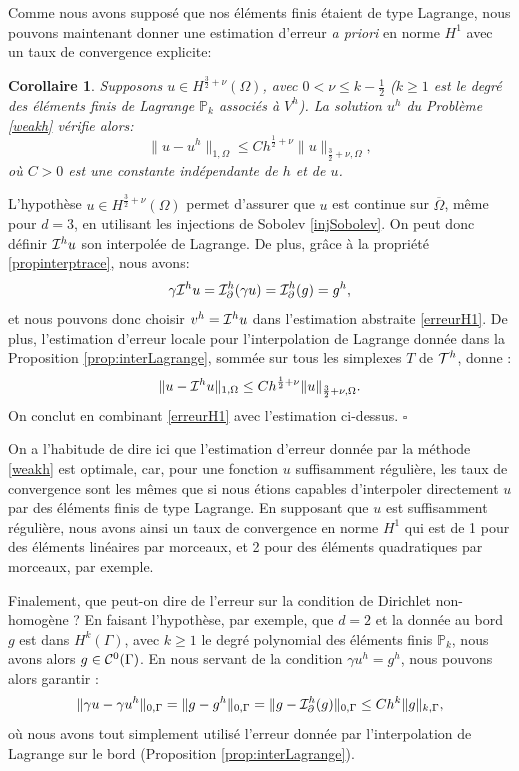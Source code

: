 \documentclass[11pt]{book}
\newtheorem{corollary}[theorem]{Corollaire}
\newcommand{\be}{\begin{equation}}
\newcommand{\ee}{\end{equation}}
\newcommand{\bc}{\begin{corollary}}
\newcommand{\ec}{\end{corollary}}
\newcommand{\cqfd}{{$\mbox{}$\hfill$\square$}}
\newcommand{\caI}{{\cal I}}
\newcommand{\caC}{{\cal C}}
\newcommand{\caT}{{\cal T}}
\newcommand{\PP}{\mathbb{P}}
\begin{document}
Comme nous avons supposé que nos éléments finis étaient de type Lagrange, nous pouvons maintenant donner une estimation d'erreur \emph{a priori} en norme $H^1$ avec un taux de convergence explicite:

\bc Supposons $u \in H^{\frac32+\nu} (\Omega)$, avec $0 < \nu \leq k-\frac12$ ($k \geq 1$ est le degré des éléments finis de Lagrange $\PP_k$ associés à $V^h$). La solution $u^h$ du Problème \eqref{weakh} vérifie alors:
\be \label{erreurH1lagrange}
 \| u - u^h \|_{1,\Omega} \leq C h^{\frac12+\nu} \| u \|_{\frac32+\nu,\Omega},
\ee
où $C>0$ est une constante indépendante de $h$ et de $u$.
\ec

\proof
L'hypothèse $u \in H^{\frac32+\nu} (\Omega)$ permet d'assurer que $u$ est continue sur $\overline{\Omega}$, même pour $d=3$, en utilisant les injections de Sobolev \eqref{injSobolev}. On peut donc définir $\caI^h u$ son interpolée de Lagrange. De plus, grâce à la propriété \eqref{propinterptrace}, nous avons:
\[
\gamma \caI^h u = \caI^h_\partial (\gamma u) = \caI^h_\partial (g) = g^h,
\]
et nous pouvons donc choisir $v^h = \caI^h u$ dans l'estimation abstraite \eqref{erreurH1}.  De plus, l'estimation d'erreur locale pour l'interpolation de Lagrange donnée dans la Proposition \ref{prop:interLagrange}, sommée sur tous les simplexes $T$ de $\caT^h$, donne : %
\[
\| u - \caI^h u \|_{1,\Omega} \leq C h^{\frac12+\nu} \| u \|_{\frac32+\nu,\Omega}.
\]
On conclut en combinant \eqref{erreurH1} avec l'estimation ci-dessus.
\cqfd


On a l'habitude de dire ici que l'estimation d'erreur donnée par la méthode \eqref{weakh} est optimale, car, pour une fonction $u$ suffisamment régulière, les taux de convergence sont les mêmes que si nous étions capables d'interpoler directement $u$ par des éléments finis de type Lagrange. En supposant que $u$ est suffisamment régulière, nous avons ainsi un taux de convergence en norme $H^1$ qui est de 1 pour des éléments linéaires par morceaux, et 2 pour des éléments quadratiques par morceaux, par exemple.

Finalement, que peut-on dire de l'erreur sur la condition de Dirichlet non-homogène ? 
 En faisant l'hypothèse, par exemple, que $d=2$ et la donnée au bord $g$ est dans $H^k(\Gamma)$, avec $k\geq1$ le degré polynomial des éléments finis $\PP_k$, nous avons alors $g \in \caC^0(\Gamma)$. En nous servant de la condition $\gamma u^h = g^h$, nous pouvons alors garantir :
\[
\| \gamma u - \gamma u^h \|_{0,\Gamma} =
\| g - g^h \|_{0,\Gamma} =
\| g - \caI^h_\partial (g) \|_{0,\Gamma} \leq C h^k \| g \|_{k,\Gamma},
\]
où nous avons tout simplement utilisé l'erreur donnée par l'interpolation de Lagrange sur le bord (Proposition \ref{prop:interLagrange}).
\end{document}
